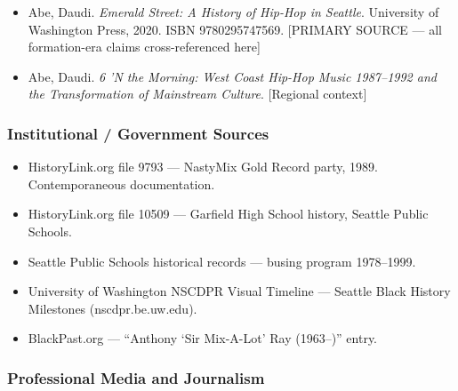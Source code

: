 \documentclass[11pt,letterpaper]{article}
\begin{document}
\begin{itemize}
  \item Abe, Daudi. \textit{Emerald Street: A History of Hip-Hop in Seattle}. University of Washington Press, 2020. ISBN 9780295747569. [PRIMARY SOURCE --- all formation-era claims cross-referenced here]
  \item Abe, Daudi. \textit{6 'N the Morning: West Coast Hip-Hop Music 1987--1992 and the Transformation of Mainstream Culture}. [Regional context]
\end{itemize}

\subsubsection{Institutional / Government Sources}

\begin{itemize}
  \item HistoryLink.org file 9793 --- NastyMix Gold Record party, 1989. Contemporaneous documentation.
  \item HistoryLink.org file 10509 --- Garfield High School history, Seattle Public Schools.
  \item Seattle Public Schools historical records --- busing program 1978--1999.
  \item University of Washington NSCDPR Visual Timeline --- Seattle Black History Milestones (nscdpr.be.uw.edu).
  \item BlackPast.org --- ``Anthony `Sir Mix-A-Lot' Ray (1963--)'' entry.
\end{itemize}

\subsubsection{Professional Media and Journalism}
\end{document}

